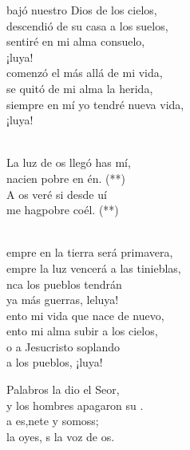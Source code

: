 \documentclass[12pt]{article}
\begin{document}
\begin{multicols*}{2}
\begin{cancion}%
	 bajó nuestro Dios de los cielos, \\
	 descendió de su casa a los suelos,\\
	 sentiré en mi alma consuelo, \\
	¡luya! \\
	 comenzó el más allá de mi vida, \\
	 se quitó de mi alma la herida,\\
	 siempre en mí yo tendré nueva vida,\\
	¡luya! \\\jump\\
	\begin{chorus}%
	La luz de os llegó has mí, \\
	nacien pobre en én. (**)\\
	A os veré si desde uí \\
	me hagpobre coél. (**)\\
	\end{chorus}%
	\jump\\
	empre en la tierra será primavera, \\
	empre la luz vencerá a las tinieblas,\\
	nca los pueblos tendrán \\
	ya más guerras, leluya!\\
	ento mi vida que nace de nuevo, \\
	ento mi alma subir a los cielos,\\
	o a Jesucristo soplando \\
	a los pueblos, ¡luya! \\
\end{cancion}%

\begin{cancion}[La Palabra][]%
	 Palabros la dio el Seor,\\
	y los hombres apagaron su .\\
	a es,nete y somoss;\\
	 la oyes, s la voz de os.\\
\end{cancion}%


\end{multicols*}
\end{document}
